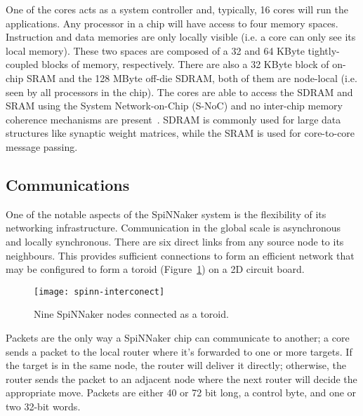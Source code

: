 One of the cores acts as a system controller and, typically, 16 cores will run the applications. Any processor in a chip will have access to four memory spaces. Instruction and data memories are only locally visible (i.e. a core can only see its local memory). These two spaces are composed of a 32 and 64 KByte tightly-coupled blocks of memory, respectively. There are also a 32 KByte block of on-chip SRAM and the 128 MByte off-die SDRAM, both of them are node-local (i.e. seen by all processors in the chip). The cores are able to access the SDRAM and SRAM using the System Network-on-Chip (S-NoC) and no inter-chip memory coherence mechanisms are present~\cite{furber2013overview}. SDRAM is commonly used for large data structures like synaptic weight matrices, while the SRAM is used for core-to-core message passing.

\subsection{Communications}

One of the notable aspects of the SpiNNaker system is the flexibility of its networking infrastructure. Communication in the global scale is asynchronous and locally synchronous. There are six direct links from any source node to its neighbours. This provides sufficient connections to form an efficient network that may be configured to form a toroid (Figure~\ref{fig:hw:spinn-toroid}) on a 2D circuit board.

\begin{figure}[h]
  \begin{center}
    \texttt{[image: spinn-interconect]}
    \caption{Nine SpiNNaker nodes connected as a toroid.}
    \label{fig:hw:spinn-toroid}
  \end{center}
\end{figure}

Packets are the only way a SpiNNaker chip can communicate to another; a core sends a packet to the local router where it's forwarded to one or more targets. If the target is in the same node, the router will deliver it directly; otherwise, the router sends the packet to an adjacent node where the next router will decide the appropriate move. Packets are either 40 or 72 bit long, a control byte, and one or two 32-bit words.

